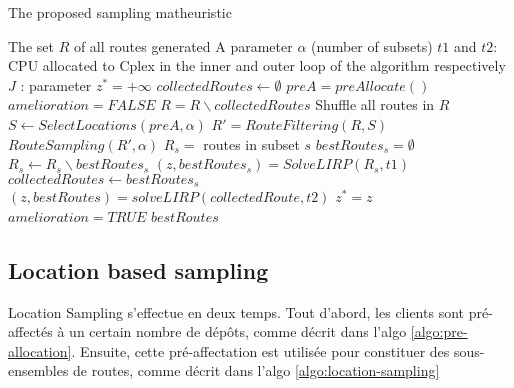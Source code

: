 \documentclass[10pt, a4paper]{article}
\begin{document}
\begin{algorithm}
	\caption{The proposed sampling matheuristic}
	\label{mainalgo}
	\begin{algorithmic}[1]
		\REQUIRE  The set $R$ of all routes generated
		\REQUIRE A parameter $\alpha$ (number of subsets)
		\REQUIRE $t1$ and $t2$: CPU allocated to Cplex in the inner and outer loop of the algorithm respectively
		\REQUIRE $J$ : parameter
		\STATE $z^*= +\infty$
		\STATE $collectedRoutes \leftarrow \emptyset$
		\STATE $preA = preAllocate()$					 
		\REPEAT
			\STATE $amelioration = FALSE$
			\STATE $R =  R \backslash collectedRoutes$
			\STATE Shuffle all routes in $R$
			\STATE $S \leftarrow SelectLocations(preA, \alpha)$ 
			\STATE $R' = RouteFiltering(R,S)$
			\STATE $RouteSampling(R',\alpha)$	
				\STATE $R_s = $ routes in subset $s$
				\STATE $bestRoutes_s = \emptyset$
					\STATE $R_s \leftarrow R_s \backslash bestRoutes_s$ 
					\STATE $(z,bestRoutes_s) = SolveLIRP(R_s,t1)$ 
					\STATE $collectedRoutes \leftarrow bestRoutes_s$
				\ENDFOR
			\ENDFOR
			\STATE 	$(z,bestRoutes) = solveLIRP(collectedRoute, t2)$
				\STATE $z^*=z$
				\STATE $amelioration =TRUE$
			\ENDIF
		\RETURN $bestRoutes$
	\end{algorithmic}
\end{algorithm}


\subsection{Location based sampling}

Location Sampling s'effectue en deux temps. 
Tout d'abord, les clients sont pré-affectés à un certain nombre de dépôts, comme décrit dans l'algo \ref{algo:pre-allocation}.
Ensuite, cette pré-affectation est utilisée pour constituer des sous-ensembles de routes, comme décrit dans l'algo 	\ref{algo:location-sampling}
\end{document}
